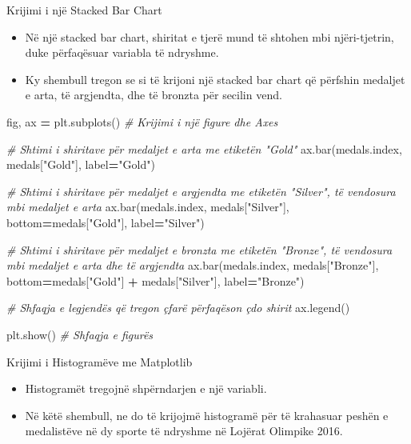 \documentclass[
  ignorenonframetext,
]{beamer}
\newenvironment{Shaded}{\begin{snugshade}}{\end{snugshade}}
\newcommand{\CommentTok}[1]{\textcolor[rgb]{0.56,0.35,0.01}{\textit{#1}}}
\newcommand{\NormalTok}[1]{#1}
\newcommand{\OperatorTok}[1]{\textcolor[rgb]{0.81,0.36,0.00}{\textbf{#1}}}
\newcommand{\StringTok}[1]{\textcolor[rgb]{0.31,0.60,0.02}{#1}}
\begin{document}
\begin{frame}[fragile]{Krijimi i një Stacked Bar Chart}
\protect\hypertarget{krijimi-i-njuxeb-stacked-bar-chart}{}
\begin{itemize}
\item
  Në një stacked bar chart, shiritat e tjerë mund të shtohen mbi
  njëri-tjetrin, duke përfaqësuar variabla të ndryshme.
\item
  Ky shembull tregon se si të krijoni një stacked bar chart që përfshin
  medaljet e arta, të argjendta, dhe të bronzta për secilin vend.
\end{itemize}


\begin{Shaded}
\begin{Highlighting}[]
\NormalTok{fig, ax }\OperatorTok{=}\NormalTok{ plt.subplots()  }\CommentTok{\# Krijimi i një figure dhe Axes}

\CommentTok{\# Shtimi i shiritave për medaljet e arta me etiketën "Gold"}
\NormalTok{ax.bar(medals.index, medals[}\StringTok{"Gold"}\NormalTok{], label}\OperatorTok{=}\StringTok{"Gold"}\NormalTok{)}

\CommentTok{\# Shtimi i shiritave për medaljet e argjendta me etiketën "Silver", të vendosura mbi medaljet e arta}
\NormalTok{ax.bar(medals.index, medals[}\StringTok{"Silver"}\NormalTok{], bottom}\OperatorTok{=}\NormalTok{medals[}\StringTok{"Gold"}\NormalTok{], label}\OperatorTok{=}\StringTok{"Silver"}\NormalTok{)}

\CommentTok{\# Shtimi i shiritave për medaljet e bronzta me etiketën "Bronze", të vendosura mbi medaljet e arta dhe të argjendta}
\NormalTok{ax.bar(medals.index, medals[}\StringTok{"Bronze"}\NormalTok{], bottom}\OperatorTok{=}\NormalTok{medals[}\StringTok{"Gold"}\NormalTok{] }\OperatorTok{+}\NormalTok{ medals[}\StringTok{"Silver"}\NormalTok{], label}\OperatorTok{=}\StringTok{"Bronze"}\NormalTok{)}

\CommentTok{\# Shfaqja e legjendës që tregon çfarë përfaqëson çdo shirit}
\NormalTok{ax.legend()}

\NormalTok{plt.show()  }\CommentTok{\# Shfaqja e figurës}
\end{Highlighting}
\end{Shaded}
\end{frame}

\begin{frame}{Krijimi i Histogramëve me Matplotlib}
\protect\hypertarget{krijimi-i-histogramuxebve-me-matplotlib}{}
\begin{itemize}
\item
  Histogramët tregojnë shpërndarjen e një variabli.
\item
  Në këtë shembull, ne do të krijojmë histogramë për të krahasuar peshën
  e medalistëve në dy sporte të ndryshme në Lojërat Olimpike 2016.
\end{itemize}
\end{frame}
\end{document}
